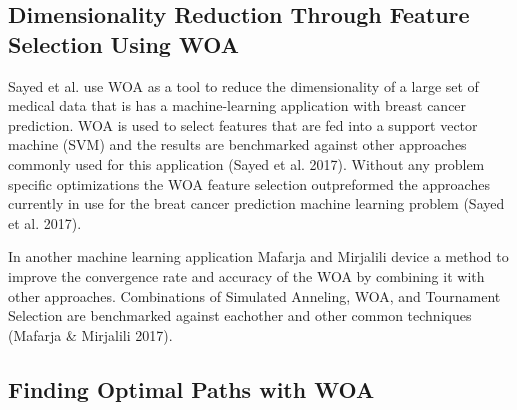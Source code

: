 \documentclass[11pt]{article}
\begin{document}
\subsection*{Dimensionality Reduction Through Feature Selection Using WOA}
Sayed et al. use WOA as a tool to reduce the dimensionality of a large set of medical data that is has a machine-learning application with breast cancer prediction.
WOA is used to select features that are fed into a support vector machine (SVM) and the results are benchmarked against other approaches commonly used for this application (Sayed et al. 2017).
Without any problem specific optimizations the WOA feature selection outpreformed the approaches currently in use for the breat cancer prediction machine learning problem (Sayed et al. 2017).

In another machine learning application Mafarja and Mirjalili device a method to improve the convergence rate and accuracy of the WOA by combining it with other approaches.
Combinations of Simulated Anneling, WOA, and Tournament Selection are benchmarked against eachother and other common techniques (Mafarja \& Mirjalili 2017).


\subsection*{Finding Optimal Paths with WOA}
\end{document}
